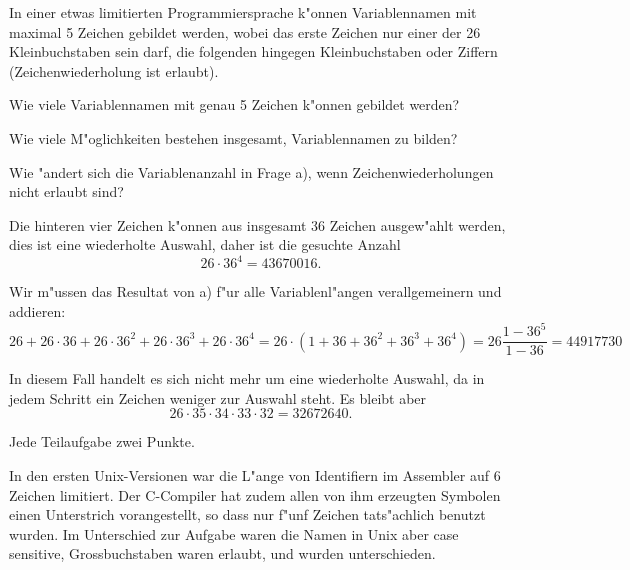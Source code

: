 In einer etwas limitierten Programmiersprache k"onnen Variablennamen
mit maximal 5 Zeichen gebildet werden, wobei das erste Zeichen nur
einer der 26 Kleinbuchstaben sein darf, die folgenden hingegen Kleinbuchstaben
oder Ziffern (Zeichenwiederholung ist erlaubt).
\begin{teilaufgaben}
\item
Wie viele Variablennamen mit genau 5 Zeichen k"onnen gebildet werden?
\item
Wie viele M"oglichkeiten bestehen insgesamt, Variablennamen zu bilden?
\item
Wie "andert sich die Variablenanzahl in Frage a),
wenn Zeichenwiederholungen nicht erlaubt sind?
\end{teilaufgaben}

\begin{loesung}
\begin{teilaufgaben}
\item Die hinteren vier Zeichen k"onnen aus insgesamt 36 Zeichen ausgew"ahlt
werden, dies ist eine wiederholte Auswahl, daher ist die gesuchte Anzahl
\[
26\cdot 36^4=43670016.
\]
\item 
Wir m"ussen das Resultat von a) f"ur alle Variablenl"angen verallgemeinern
und addieren:
\[
26
+
26\cdot 36
+
26\cdot 36^2
+
26\cdot 36^3
+
26\cdot 36^4
=
26 \cdot (1 + 36 + 36^2 + 36^3 + 36^4)=26\frac{1-36^5}{1-36}
=
44917730
\]
\item
In diesem Fall handelt es sich nicht mehr um eine wiederholte Auswahl,
da in jedem Schritt ein Zeichen weniger zur Auswahl steht. Es bleibt
aber
\[
26 \cdot 35 \cdot 34 \cdot 33 \cdot 32=32672640.
\]
\end{teilaufgaben}
\end{loesung}

\begin{bewertung}
Jede Teilaufgabe zwei Punkte.
\end{bewertung}

\begin{diskussion}
In den ersten Unix-Versionen war die L"ange von Identifiern im Assembler
auf 6 Zeichen limitiert. Der C-Compiler hat zudem allen von ihm 
erzeugten Symbolen einen Unterstrich vorangestellt, so dass nur f"unf
Zeichen tats"achlich benutzt wurden. Im Unterschied zur Aufgabe
waren die Namen in Unix aber case sensitive, Grossbuchstaben waren erlaubt,
und wurden unterschieden.
\end{diskussion}

